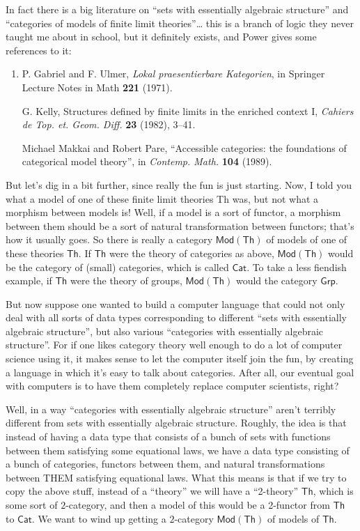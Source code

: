 \documentclass{article}
\begin{document}
In fact there is a big literature on ``sets with essentially algebraic
structure'' and ``categories of models of finite limit
theories''\ldots{} this is a branch of logic they never taught me about
in school, but it definitely exists, and Power gives some references to
it:

\begin{enumerate}
\def\labelenumi{\arabic{enumi})}
\setcounter{enumi}{2}
\item
  P. Gabriel and F. Ulmer, \emph{Lokal praesentierbare Kategorien}, in
  Springer Lecture Notes in Math \textbf{221} (1971).

  G. Kelly, Structures defined by finite limits in the enriched context
  I, \emph{Cahiers de Top. et. Geom. Diff.} \textbf{23} (1982), 3--41.

  Michael Makkai and Robert Pare, ``Accessible categories: the
  foundations of categorical model theory'', in \emph{Contemp. Math.}
  \textbf{104} (1989).
\end{enumerate}

But let's dig in a bit further, since really the fun is just starting.
Now, I told you what a model of one of these finite limit theories Th
was, but not what a morphism between models is! Well, if a model is a
sort of functor, a morphism between them should be a sort of natural
transformation between functors; that's how it usually goes. So there is
really a category \(\mathsf{Mod}(\mathsf{Th})\) of models of one of
these theories \(\mathsf{Th}\). If \(\mathsf{Th}\) were the theory of
categories as above, \(\mathsf{Mod}(\mathsf{Th})\) would be the category
of (small) categories, which is called \(\mathsf{Cat}\). To take a less
fiendish example, if \(\mathsf{Th}\) were the theory of groups,
\(\mathsf{Mod}(\mathsf{Th})\) would the category \(\mathsf{Grp}\).

But now suppose one wanted to build a computer language that could not
only deal with all sorts of data types corresponding to different ``sets
with essentially algebraic structure'', but also various ``categories
with essentially algebraic structure''. For if one likes category theory
well enough to do a lot of computer science using it, it makes sense to
let the computer itself join the fun, by creating a language in which
it's easy to talk about categories. After all, our eventual goal with
computers is to have them completely replace computer scientists, right?

Well, in a way ``categories with essentially algebraic structure''
aren't terribly different from sets with essentially algebraic
structure. Roughly, the idea is that instead of having a data type that
consists of a bunch of sets with functions between them satisfying some
equational laws, we have a data type consisting of a bunch of
categories, functors between them, and natural transformations between
THEM satisfying equational laws. What this means is that if we try to
copy the above stuff, instead of a ``theory'' we will have a
``2-theory'' \(\mathsf{Th}\), which is some sort of \(2\)-category, and
then a model of this would be a 2-functor from \(\mathsf{Th}\) to
\(\mathsf{Cat}\). We want to wind up getting a \(2\)-category
\(\mathsf{Mod}(\mathsf{Th})\) of models of \(\mathsf{Th}\).
\end{document}
